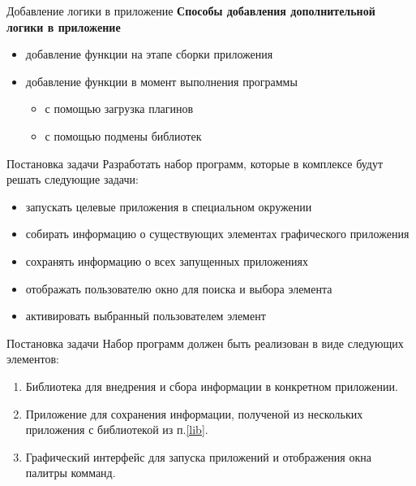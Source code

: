 \documentclass[aspectratio=1610]{beamer}
\begin{document}
\begin{frame}{Добавление логики в приложение}
	\textbf{Способы добавления дополнительной логики в приложение}
	\begin{itemize}
		\item добавление функции на этапе сборки приложения
		\item добавление функции в момент выполнения программы
		\begin{itemize}
			\item с помощью загрузка плагинов
			\item с помощью подмены библиотек
		\end{itemize}
	\end{itemize}
\end{frame}

\begin{frame}{Постановка задачи}
	Разработать набор программ, которые в комплексе будут решать следующие
	задачи:
	
	\begin{itemize}
		\item запускать целевые приложения в специальном окружении
		\item собирать информацию о существующих элементах графического приложения
		\item сохранять информацию о всех запущенных приложениях
		\item отображать пользователю окно для поиска и выбора элемента
		\item активировать выбранный пользователем элемент
	\end{itemize}
\end{frame}

\begin{frame}{Постановка задачи}
	Набор программ должен быть реализован в виде следующих элементов:
	
	\begin{enumerate}
		\item\label{lib} Библиотека для внедрения и сбора информации в конкретном
		приложении.
		\item Приложение для сохранения информации, полученой из нескольких
		приложения с библиотекой из п.\ref{lib}.
		\item Графический интерфейс для запуска приложений и отображения окна
		палитры комманд.
	\end{enumerate}
\end{frame}
\end{document}
